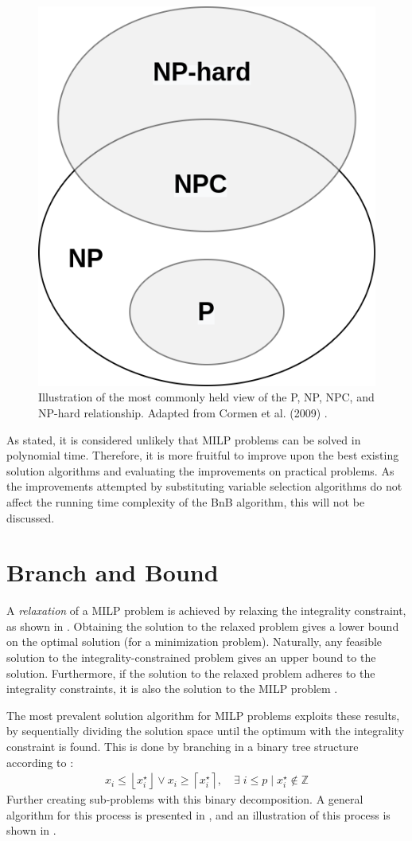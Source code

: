 \begin{figure}
    \centering
    \includegraphics[width=0.4\linewidth]{img/npc.png}
    \caption{\label{fig:np}Illustration of the most commonly held view of the P, NP, NPC, and NP-hard relationship. Adapted from Cormen et al. (2009) \cite{cormen2009introduction}.}
\end{figure}

As stated, it is considered unlikely that \gls{MILP} problems can be solved in polynomial time. Therefore, it is more fruitful to improve upon the best existing solution algorithms and evaluating the improvements on practical problems. As the improvements attempted by substituting variable selection algorithms do not affect the running time complexity of the \gls{BnB} algorithm, this will not be discussed.  










\section{Branch and Bound}\label{sec:back_bnb}

A \textit{relaxation} of a \gls{MILP} problem is achieved by relaxing the integrality constraint, as shown in . Obtaining the solution to the relaxed problem gives a lower bound on the optimal solution (for a minimization problem). Naturally, any feasible solution to the integrality-constrained problem gives an upper bound to the solution. Furthermore, if the solution to the relaxed problem adheres to the integrality constraints, it is also the solution to the \gls{MILP} problem \cite{wolsey2020integer}.






The most prevalent solution algorithm for \gls{MILP} problems exploits these results, by sequentially dividing the solution space until the optimum with the integrality constraint is found. This is done by branching in a binary tree structure according to \cite{gasse2019exact}:
\begin{align} \label{eq:branch}
    x_{i} \leq\left\lfloor x_{i}^{\star}\right\rfloor \vee x_{i} \geq\left\lceil x_{i}^{\star}\right\rceil, \quad \exists \; i \leq p \mid x_{i}^{\star} \notin \mathbb{Z}    
\end{align}
Further creating sub-problems with this binary decomposition. A general algorithm for this process is presented in , and an illustration of this process is shown in .

